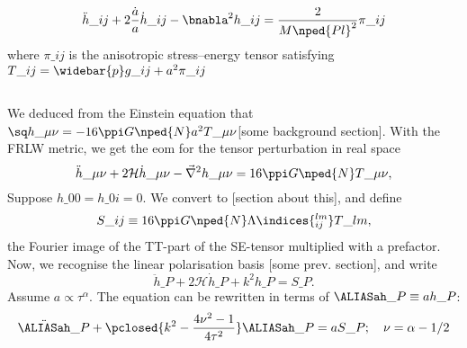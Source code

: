 \begin{draft}
{            
            \begin{equation}
                \ddot{h}\_{ij} + 2\frac{\dot{a}}{a} \dot{h}\_{ij} - \bnabla^2 h\_{ij}  = \frac{2}{M\nped{Pl}^2} \pi\_{ij}
            \end{equation}
            where $\pi\_{ij}$ is the anisotropic stress--energy tensor satisfying $T\_{ij}=\widebar{p}g\_{ij} + a^2 \pi\_{ij}$
    
        }
    \end{draft}




\begin{draft}
        {
    \newcommand{\ah}{\ALIASah}
    \newcommand{\Src}{S}

    \subsection*{}
    We deduced from the Einstein equation that $\sq h\_{\mu\nu} =- 16 \ppi G\nped{N} a^2T\_{\mu\nu}$\nc{}[some background section]. With the FRLW metric, we get the eom for the tensor perturbation in real space
    \begin{equation}
        \ddot{h}\_{\mu\nu}+ 2 \mathcal{H} \dot{h}\_{\mu\nu} -\vec{\nabla}^2 h\_{\mu\nu} = 16\ppi G\nped{N} T\_{\mu\nu},
    \end{equation}
    Suppose $h\_{00}=h\_{0i}=0$. We convert to [section about this], and define
    \begin{equation}
        S\_{ij} \equiv 16\ppi G\nped{N} \Lambda\indices{_{ij}^{lm}} T\_{lm},%
    \end{equation}
    the Fourier image of the TT-part of the SE-tensor multiplied with a prefactor.
    Now, we recognise the linear polarisation basis [some prev. section], and write
    \begin{equation}
        \ddot{h}\_{P} + 2 \mathcal{H} \dot{h}\_{P} + k^2 h\_{P} = S\_{P}.
    \end{equation}
    Assume $a\propto \tau^\alpha$. The equation can be rewritten in terms of $\ah\_{P}\equiv a h\_P$:
    \begin{equation}
        \ddot{\ah}\_P + \pclosed{k^2-\frac{4\nu^2 - 1}{4\tau^2}}\ah\_P = a S\_P; \quad \nu = \alpha - 1/2
    \end{equation}
}
\end{draft}
